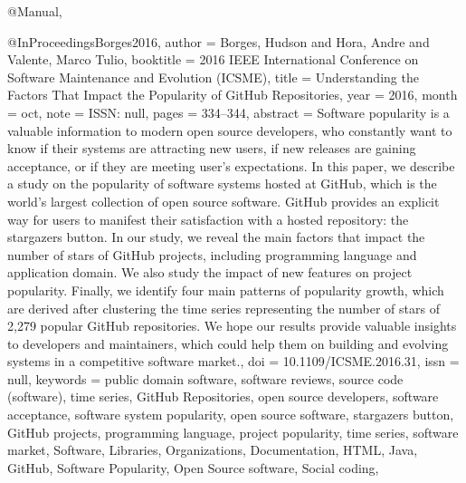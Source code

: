 {{{{{{@Manual{,
}

@InProceedings{Borges2016,
  author    = {Borges, Hudson and Hora, Andre and Valente, Marco Tulio},
  booktitle = {2016 {IEEE} {International} {Conference} on {Software} {Maintenance} and {Evolution} ({ICSME})},
  title     = {Understanding the {Factors} {That} {Impact} the {Popularity} of {GitHub} {Repositories}},
  year      = {2016},
  month     = oct,
  note      = {ISSN: null},
  pages     = {334--344},
  abstract  = {Software popularity is a valuable information to modern open source developers, who constantly want to know if their systems are attracting new users, if new releases are gaining acceptance, or if they are meeting user's expectations. In this paper, we describe a study on the popularity of software systems hosted at GitHub, which is the world's largest collection of open source software. GitHub provides an explicit way for users to manifest their satisfaction with a hosted repository: the stargazers button. In our study, we reveal the main factors that impact the number of stars of GitHub projects, including programming language and application domain. We also study the impact of new features on project popularity. Finally, we identify four main patterns of popularity growth, which are derived after clustering the time series representing the number of stars of 2,279 popular GitHub repositories. We hope our results provide valuable insights to developers and maintainers, which could help them on building and evolving systems in a competitive software market.},
  doi       = {10.1109/ICSME.2016.31},
  issn      = {null},
  keywords  = {public domain software, software reviews, source code (software), time series, GitHub Repositories, open source developers, software acceptance, software system popularity, open source software, stargazers button, GitHub projects, programming language, project popularity, time series, software market, Software, Libraries, Organizations, Documentation, HTML, Java, GitHub, Software Popularity, Open Source software, Social coding},
}


}}}}}}
